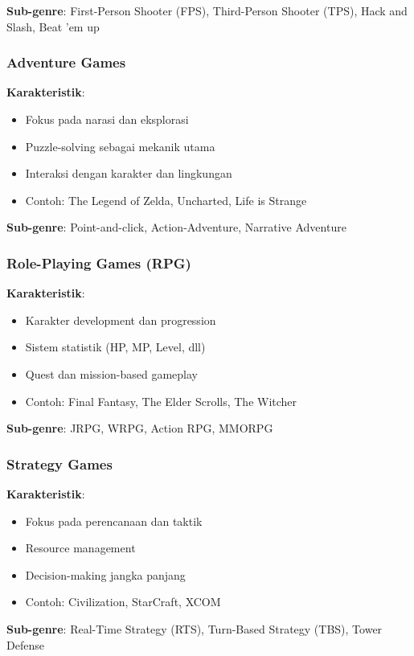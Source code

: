 \textbf{Sub-genre}: First-Person Shooter (FPS), Third-Person Shooter (TPS), Hack and Slash, Beat 'em up

\subsubsection{Adventure Games}

\textbf{Karakteristik}:
\begin{itemize}
\item Fokus pada narasi dan eksplorasi
\item Puzzle-solving sebagai mekanik utama
\item Interaksi dengan karakter dan lingkungan
\item Contoh: The Legend of Zelda, Uncharted, Life is Strange
\end{itemize}

\textbf{Sub-genre}: Point-and-click, Action-Adventure, Narrative Adventure

\subsubsection{Role-Playing Games (RPG)}

\textbf{Karakteristik}:
\begin{itemize}
\item Karakter development dan progression
\item Sistem statistik (HP, MP, Level, dll)
\item Quest dan mission-based gameplay
\item Contoh: Final Fantasy, The Elder Scrolls, The Witcher
\end{itemize}

\textbf{Sub-genre}: JRPG, WRPG, Action RPG, MMORPG

\subsubsection{Strategy Games}

\textbf{Karakteristik}:
\begin{itemize}
\item Fokus pada perencanaan dan taktik
\item Resource management
\item Decision-making jangka panjang
\item Contoh: Civilization, StarCraft, XCOM
\end{itemize}

\textbf{Sub-genre}: Real-Time Strategy (RTS), Turn-Based Strategy (TBS), Tower Defense

